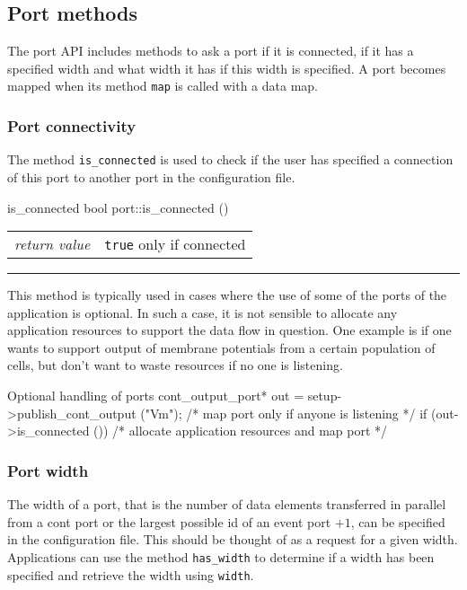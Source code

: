\documentclass[a4paper]{report}
\makeatletter
\newenvironment{parameters}%
{\begin{tabular}{@{\hspace{2em}}lp{0.6\textwidth}}}%
{\end{tabular}\par\vspace{1mm}\par\hrule\par\vspace{5mm}}
\makeatother
\begin{document}
\subsection{Port methods}

The port API includes methods to ask a port if it is connected, if it
has a specified width and what width it has if this width is
specified.  A port becomes mapped when its method \lstinline|map| is
called with a data map.

\subsubsection{Port connectivity}

The method \lstinline|is_connected| is used to check if the user has
specified a connection of this port to another port in the
configuration file.

\begin{head}{is_connected}
  bool port::is_connected ()
\end{head}
\begin{parameters}
  \emph{return value} & \lstinline|true| only if connected\\
\end{parameters}

This method is typically used in cases where the use of some of the
ports of the application is optional.  In such a case, it is not
sensible to allocate any application resources to support the data
flow in question.  One example is if one wants to support output of
membrane potentials from a certain population of cells, but don't want
to waste resources if no one is listening.

\begin{code}{Optional handling of ports}
cont_output_port* out = setup->publish_cont_output ("Vm");
/* map port only if anyone is listening */
if (out->is_connected ())
  /* allocate application resources and map port */
\end{code}

\subsubsection{Port width}
\label{sec:width}

The width of a port, that is the number of data
elements transferred in parallel from a cont port or the largest
possible id of an event port $+ 1$, can be specified in the
configuration file. This should be thought of as a request for a given
width.  Applications can use the method \lstinline|has_width| to
determine if a width has been specified and retrieve the width using
\lstinline|width|.
\end{document}
